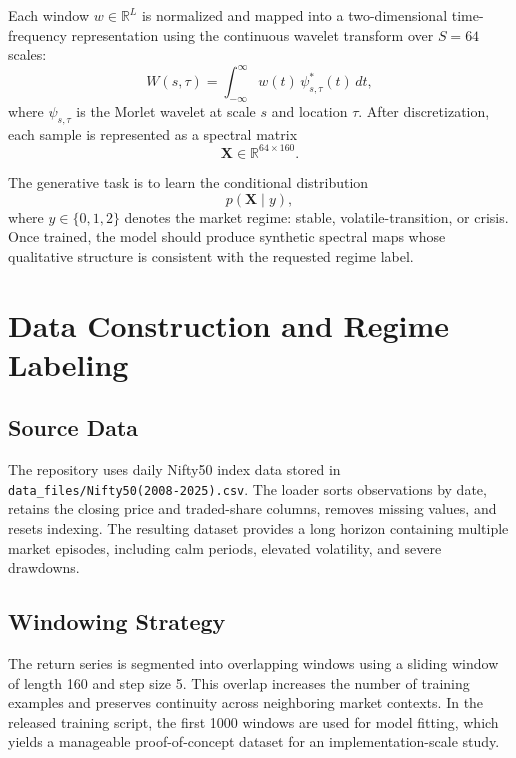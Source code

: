\documentclass[conference]{IEEEtran}
\begin{document}
Each window $w \in \mathbb{R}^{L}$ is normalized and mapped into a two-dimensional time-frequency representation using the continuous wavelet transform over $S=64$ scales:
\begin{equation}
W(s,\tau) = \int_{-\infty}^{\infty} w(t)\,\psi_{s,\tau}^{*}(t)\,dt,
\end{equation}
where $\psi_{s,\tau}$ is the Morlet wavelet at scale $s$ and location $\tau$. After discretization, each sample is represented as a spectral matrix
\begin{equation}
\mathbf{X} \in \mathbb{R}^{64 \times 160}.
\end{equation}

The generative task is to learn the conditional distribution
\begin{equation}
p(\mathbf{X}\mid y),
\end{equation}
where $y \in \{0,1,2\}$ denotes the market regime: stable, volatile-transition, or crisis. Once trained, the model should produce synthetic spectral maps whose qualitative structure is consistent with the requested regime label.

\section{Data Construction and Regime Labeling}
\subsection{Source Data}
The repository uses daily Nifty50 index data stored in \texttt{data\_files/Nifty50(2008-2025).csv}. The loader sorts observations by date, retains the closing price and traded-share columns, removes missing values, and resets indexing. The resulting dataset provides a long horizon containing multiple market episodes, including calm periods, elevated volatility, and severe drawdowns.

\subsection{Windowing Strategy}
The return series is segmented into overlapping windows using a sliding window of length 160 and step size 5. This overlap increases the number of training examples and preserves continuity across neighboring market contexts. In the released training script, the first 1000 windows are used for model fitting, which yields a manageable proof-of-concept dataset for an implementation-scale study.
\end{document}
